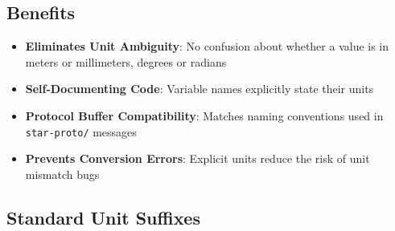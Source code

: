 \subsection{Benefits}

\begin{itemize}
  \item \textbf{Eliminates Unit Ambiguity}: No confusion about whether a value is in meters or millimeters, degrees or radians
  \item \textbf{Self-Documenting Code}: Variable names explicitly state their units
  \item \textbf{Protocol Buffer Compatibility}: Matches naming conventions used in \texttt{star-proto/} messages
  \item \textbf{Prevents Conversion Errors}: Explicit units reduce the risk of unit mismatch bugs
\end{itemize}

\subsection{Standard Unit Suffixes}

